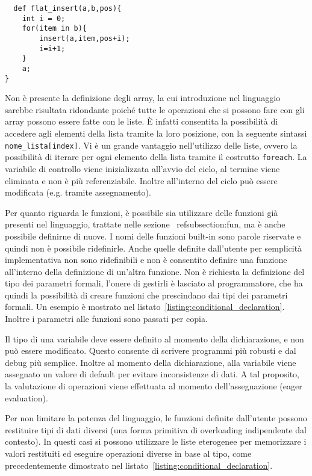 \documentclass[10pt]{article}
\begin{document}
\begin{verbatim}
  def flat_insert(a,b,pos){
    int i = 0;
    for(item in b){
        insert(a,item,pos+i);
        i=i+1;   
    }
    a;
}
\end{verbatim}

Non è presente la definizione degli array, la cui introduzione nel linguaggio sarebbe risultata ridondante poiché tutte le operazioni che si possono fare con gli array possono essere fatte con le liste. È infatti consentita la possibilità di accedere agli elementi della lista tramite la loro posizione, con la seguente sintassi \texttt{nome\_lista[index]}. Vi è un grande vantaggio nell'utilizzo delle liste, ovvero la possibilità di iterare per ogni elemento della lista tramite il costrutto \texttt{foreach}. La variabile di controllo viene inizializzata all'avvio del ciclo, al termine viene eliminata e non è più referenziabile. Inoltre all'interno del ciclo può essere modificata (e.g. tramite assegnamento).

Per quanto riguarda le funzioni, è possibile sia utilizzare delle funzioni già presenti nel linguaggio, trattate nelle sezione ~ref{subsection:fun}, ma è anche possibile definirne di nuove. I nomi delle funzioni built-in sono parole riservate e quindi non è possibile ridefinirle. Anche quelle definite dall'utente per semplicità implementativa non sono ridefinibili e non è consentito definire una funzione all'interno della definizione di un'altra funzione. Non è 
richiesta la definizione del tipo dei parametri formali, l'onere di gestirli è lasciato al programmatore, che ha quindi la possibilità di creare funzioni che prescindano dai tipi dei parametri formali. Un esempio è mostrato nel listato~\ref{listing:conditional_declaration}. Inoltre i parametri alle funzioni sono passati per copia. 

Il tipo di una variabile deve essere definito al momento della dichiarazione, e non può essere modificato. Questo consente di scrivere programmi più robusti e dal debug più semplice. Inoltre al momento della dichiarazione, alla variabile viene assegnato un valore di default per evitare inconsistenze di dati. A tal proposito, la valutazione di operazioni viene effettuata al momento dell'assegnazione (eager evaluation).

Per non limitare la potenza del linguaggio, le funzioni definite dall'utente possono restituire tipi di dati diversi (una forma primitiva di overloading indipendente dal contesto). In questi casi si possono utilizzare le liste eterogenee per memorizzare i valori restituiti ed eseguire operazioni diverse in base al tipo, come precedentemente dimostrato nel listato~\ref{listing:conditional_declaration}. 
\end{document}
